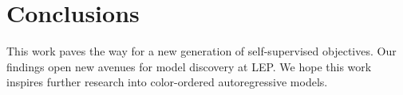 \section{Conclusions}\label{sec:conclusions}

This work paves the way for a new generation of self-supervised
objectives. Our findings open new avenues for model discovery at LEP. We
hope this work inspires further research into color-ordered
autoregressive models.

